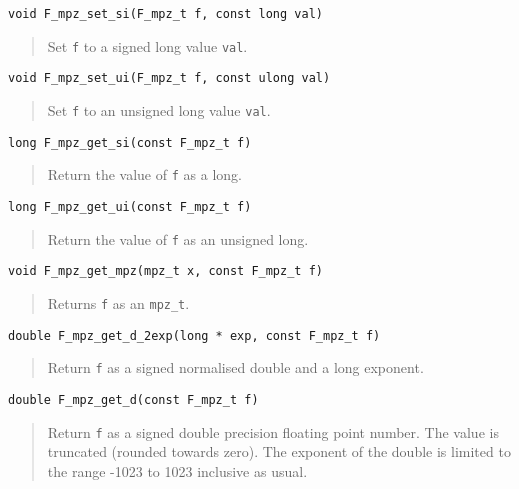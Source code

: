 \documentclass[a4paper,10pt]{article}
\newcommand{\code}{\lstinline}
\begin{document}
\begin{lstlisting}
void F_mpz_set_si(F_mpz_t f, const long val)
\end{lstlisting}
\begin{quote}
Set \code{f} to a signed long value \code{val}.
\end{quote}

\begin{lstlisting}
void F_mpz_set_ui(F_mpz_t f, const ulong val)
\end{lstlisting}
\begin{quote}
Set \code{f} to an unsigned long value \code{val}.
\end{quote}

\begin{lstlisting}
long F_mpz_get_si(const F_mpz_t f)
\end{lstlisting}
\begin{quote}
Return the value of \code{f} as a long.
\end{quote}

\begin{lstlisting}
long F_mpz_get_ui(const F_mpz_t f)
\end{lstlisting}
\begin{quote}
Return the value of \code{f} as an unsigned long.
\end{quote}

\begin{lstlisting}
void F_mpz_get_mpz(mpz_t x, const F_mpz_t f)
\end{lstlisting}
\begin{quote}
Returns \code{f} as an \code{mpz_t}.
\end{quote}

\begin{lstlisting}
double F_mpz_get_d_2exp(long * exp, const F_mpz_t f)
\end{lstlisting}
\begin{quote}
Return \code{f} as a signed normalised double and a long exponent.
\end{quote}

\begin{lstlisting}
double F_mpz_get_d(const F_mpz_t f)
\end{lstlisting}
\begin{quote}
Return \code{f} as a signed double precision floating point number. The value is truncated (rounded towards zero). The exponent of the double is limited to the range -1023 to 1023 inclusive as usual.
\end{quote}
\end{document}
